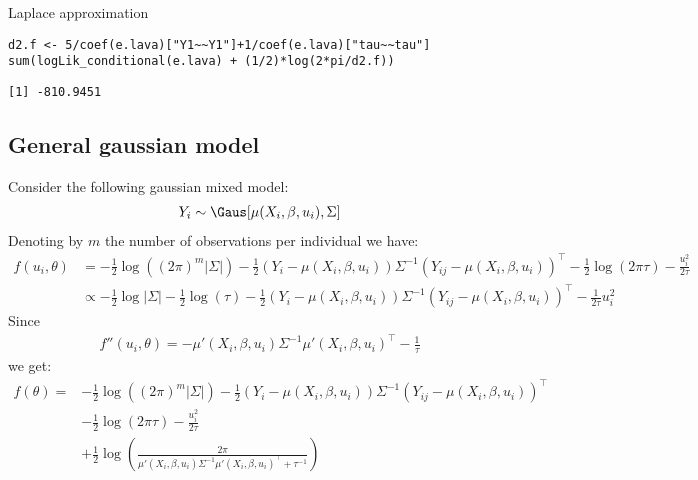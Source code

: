 \documentclass[12pt]{article}
\newcommand\trans[1]{{#1}^\intercal}%
\begin{document}
Laplace approximation
\lstset{language=r,label= ,caption= ,captionpos=b,numbers=none}
\begin{lstlisting}
d2.f <- 5/coef(e.lava)["Y1~~Y1"]+1/coef(e.lava)["tau~~tau"]
sum(logLik_conditional(e.lava) + (1/2)*log(2*pi/d2.f))
\end{lstlisting}

\begin{verbatim}
[1] -810.9451
\end{verbatim}

\clearpage

\subsection{General gaussian model}
\label{sec:orgaa99e4e}

Consider the following gaussian mixed model:
\begin{align*}
Y_{i} \sim \Gaus[\mu(X_{i}, \beta,u_i),\Sigma]
\end{align*}
Denoting by \(m\) the number of observations per individual we have:
\begin{align*}
f(u_i,\theta) &= - \frac{1}{2} \log\left((2\pi)^m |\Sigma|\right) - \frac{1}{2} (Y_{i}-\mu(X_{i},\beta,u_i)) \Sigma^{-1} \trans{(Y_{ij}-\mu(X_{i},\beta,u_i))}
- \frac{1}{2} \log(2\pi \tau) -\frac{u_i^2}{2\tau} \\
&\propto  - \frac{1}{2} \log|\Sigma| - \frac{1}{2} \log(\tau) 
- \frac{1}{2} (Y_{i}-\mu(X_{i},\beta,u_i)) \Sigma^{-1} \trans{(Y_{ij}-\mu(X_{i},\beta,u_i))}
- \frac{1}{2\tau} u_i^2 
\end{align*}
Since 
\begin{align*}
f''(u_i,\theta) = - \mu'(X_{i},\beta,u_i) \Sigma^{-1} \trans{\mu'(X_{i},\beta,u_i)} - \frac{1}{\tau}
\end{align*}
we get:
\begin{align*}
f(\theta) =
& - \frac{1}{2} \log\left((2\pi)^m |\Sigma|\right) - \frac{1}{2} (Y_{i}-\mu(X_{i},\beta,u_i)) \Sigma^{-1} \trans{(Y_{ij}-\mu(X_{i},\beta,u_i))} \\
& - \frac{1}{2} \log(2\pi \tau) -\frac{u_i^2}{2\tau} \\
& + \frac{1}{2} \log\left(\frac{2 \pi}{\mu'(X_{i},\beta,u_i) \Sigma^{-1} \trans{\mu'(X_{i},\beta,u_i)} + \tau^{-1}}\right) 
\end{align*}
\end{document}
